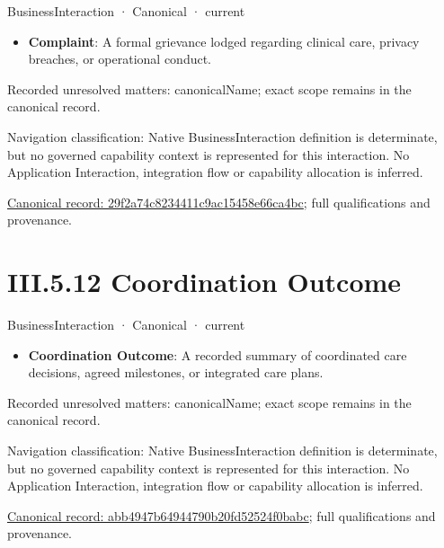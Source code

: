 \label{element:29f2a74c8234411c9ac15458e66ca4bc}
{\small BusinessInteraction · Canonical · current}\par

\begin{itemize}


\item \textbf{Complaint}: A formal grievance lodged regarding clinical care, privacy breaches, or operational conduct.

\end{itemize}

{\small Recorded unresolved matters: canonicalName; exact scope remains in the canonical record.}\par
{\small Navigation classification: Native BusinessInteraction definition is determinate, but no governed capability context is represented for this interaction. No Application Interaction, integration flow or capability allocation is inferred.}\par
{\footnotesize \href{../../../../../../../continuum/business/business-interaction/29f2a74c8234411c9ac15458e66ca4bc.md}{Canonical record: 29f2a74c8234411c9ac15458e66ca4bc}; full qualifications and provenance.}\par
\section*{III.5.12 Coordination Outcome}
\label{navigation:III.5.12}

\label{element:abb4947b64944790b20fd52524f0babc}
{\small BusinessInteraction · Canonical · current}\par

\begin{itemize}


\item \textbf{Coordination Outcome}: A recorded summary of coordinated care decisions, agreed milestones, or integrated care plans.

\end{itemize}

{\small Recorded unresolved matters: canonicalName; exact scope remains in the canonical record.}\par
{\small Navigation classification: Native BusinessInteraction definition is determinate, but no governed capability context is represented for this interaction. No Application Interaction, integration flow or capability allocation is inferred.}\par
{\footnotesize \href{../../../../../../../continuum/business/business-interaction/abb4947b64944790b20fd52524f0babc.md}{Canonical record: abb4947b64944790b20fd52524f0babc}; full qualifications and provenance.}\par
